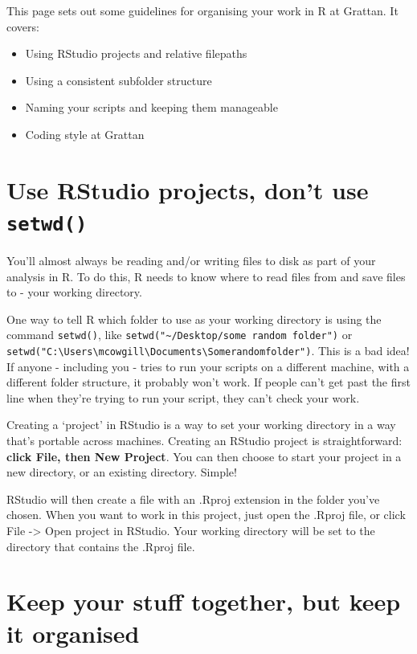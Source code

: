 \documentclass[]{book}
\providecommand{\tightlist}{%
  \setlength{\itemsep}{0pt}\setlength{\parskip}{0pt}}
\begin{document}
This page sets out some guidelines for organising your work in R at Grattan. It covers:

\begin{itemize}
\tightlist
\item
  Using RStudio projects and relative filepaths
\item
  Using a consistent subfolder structure
\item
  Naming your scripts and keeping them manageable
\item
  Coding style at Grattan
\end{itemize}

\hypertarget{use-rstudio-projects-dont-use-setwd}{%
\section{\texorpdfstring{Use RStudio projects, don't use \texttt{setwd()}}{Use RStudio projects, don't use setwd()}}\label{use-rstudio-projects-dont-use-setwd}}

You'll almost always be reading and/or writing files to disk as part of your analysis in R. To do this, R needs to know where to read files from and save files to - your working directory.

One way to tell R which folder to use as your working directory is using the command \texttt{setwd()}, like \texttt{setwd("\textasciitilde{}/Desktop/some\ random\ folder")} or \texttt{setwd("C:\textbackslash{}Users\textbackslash{}mcowgill\textbackslash{}Documents\textbackslash{}Somerandomfolder")}. This is a bad idea! If anyone - including you - tries to run your scripts on a different machine, with a different folder structure, it probably won't work. If people can't get past the first line when they're trying to run your script, they can't check your work.

Creating a `project' in RStudio is a way to set your working directory in a way that's portable across machines. Creating an RStudio project is straightforward: \textbf{click File, then New Project}. You can then choose to start your project in a new directory, or an existing directory. Simple!

RStudio will then create a file with an .Rproj extension in the folder you've chosen. When you want to work in this project, just open the .Rproj file, or click File -\textgreater{} Open project in RStudio. Your working directory will be set to the directory that contains the .Rproj file.

\hypertarget{keep-your-stuff-together-but-keep-it-organised}{%
\section{Keep your stuff together, but keep it organised}\label{keep-your-stuff-together-but-keep-it-organised}}
\end{document}
